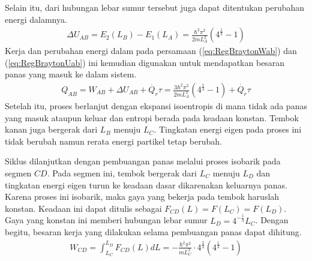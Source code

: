 Selain itu, dari hubungan lebar sumur tersebut juga dapat ditentukan perubahan energi dalamnya.
\begin{align}
    \Delta U_{AB} = E_2(L_B) - E_1(L_A) = \frac{\hbar^2\pi^2}{2mL_A^2}(4^\frac{1}{3} - 1) \label{eq:RegBraytonUab}
\end{align}
Kerja dan perubahan energi dalam pada persamaan (\ref{eq:RegBraytonWab}) dan (\ref{eq:RegBraytonUab}) ini kemudian digunakan untuk mendapatkan besaran panas yang masuk ke dalam sistem. 
\begin{align}
    Q_{AB} = W_{AB} + \Delta U_{AB} + \dot{Q_r}\tau = \frac{3\hbar^2\pi^2}{2mL_A^2}(4^\frac{1}{3} - 1) + \dot{Q_r}\tau \label{eq:RegBraytonQab}
\end{align}
Setelah itu, proses berlanjut dengan ekspansi isoentropis di mana tidak ada panas yang masuk ataupun keluar dan entropi berada pada keadaan konstan. Tembok kanan juga bergerak dari \(L_B\) menuju \(L_C\). Tingkatan energi eigen pada proses ini tidak berubah namun rerata energi partikel tetap berubah.
\par Siklus dilanjutkan dengan pembuangan panas melalui proses isobarik pada segmen \(CD\). Pada segmen ini, tembok bergerak dari \(L_C\) menuju \(L_D\) dan tingkatan energi eigen turun ke keadaan dasar dikarenakan keluarnya panas. Karena proses ini isobarik, maka gaya yang bekerja pada tembok haruslah konstan. Keadaan ini dapat ditulis sebagai \(F_{CD}(L) = F(L_C) = F(L_D)\). Gaya yang konstan ini memberi hubungan lebar sumur \(L_D = 4^{-\frac{1}{3}} L_C\). Dengan begitu, besaran kerja yang dilakukan selama pembuangan panas dapat dihitung.
\begin{align}
    W_{CD} =  \int_{L_C}^{L_D} F_{CD}(L) dL = - \frac{\hbar^2\pi^2}{mL_C^3}\cdot 4^\frac{2}{3} (4^\frac{1}{3} - 1) \label{eq:RegBraytonWcd}
\end{align}
